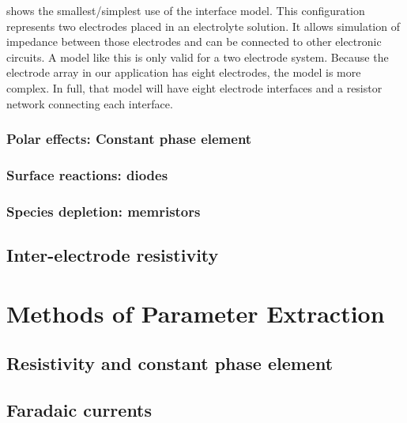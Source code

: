      shows the smallest/simplest use of the interface model.
    This configuration represents two electrodes placed in an electrolyte solution.
    It allows simulation of impedance between those electrodes and can be connected to other electronic circuits.
    A model like this is only valid for a two electrode system.
    Because the electrode array in our application has eight electrodes, the model is more complex.
    In full, that model will have eight electrode interfaces and a resistor network connecting each interface.


    \subsubsection{Polar effects: Constant phase element}

    \subsubsection{Surface reactions: diodes}
    \subsubsection{Species depletion: memristors}

  \subsection{Inter-electrode resistivity}




\section{Methods of Parameter Extraction}
  \subsection{Resistivity and constant phase element}
  \subsection{Faradaic currents}

